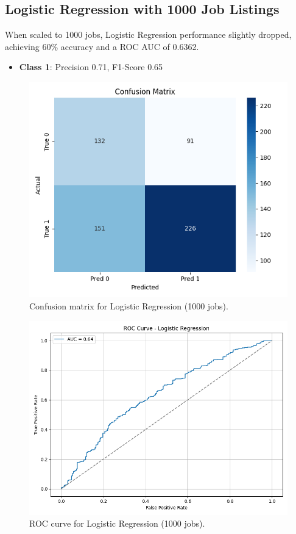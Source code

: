 \documentclass[a4paper]{article}
\begin{document}
\begin{multicols}{2}
\subsection{Logistic Regression with 1000 Job Listings}
When scaled to 1000 jobs, Logistic Regression performance slightly dropped, achieving 60\% accuracy and a ROC AUC of 0.6362.

\begin{itemize}
    \item \textbf{Class 1}: Precision 0.71, F1-Score 0.65
\end{itemize}

\begin{figure}[H]
\centering
\includegraphics[width=0.55\linewidth]{Images/conf_matrix_logreg_1000.png}
\caption{Confusion matrix for Logistic Regression (1000 jobs).}
\end{figure}

\begin{figure}[H]
\centering
\includegraphics[width=0.65\linewidth]{Images/roc_logreg_1000.png}
\caption{ROC curve for Logistic Regression (1000 jobs).}
\end{figure}


\end{multicols}
\end{document}
